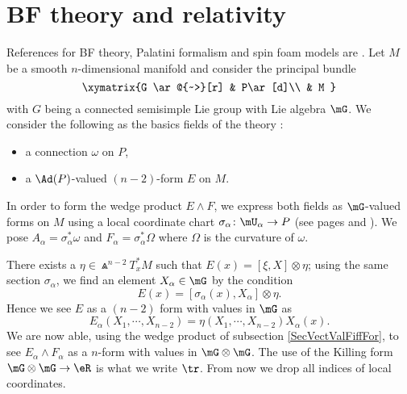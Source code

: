 \section{BF theory and relativity}

References for BF theory, Palatini formalism and spin foam models are \cite{bkindep,degesols,itospinfoam}. Let $M$ be a smooth $n$-dimensional manifold and consider the principal bundle
\begin{equation}
\xymatrix{%
 G   \ar@{~>}[r]		&	P\ar[d]\\
   				&	M
 }
\end{equation}
with $G$ being a connected semisimple Lie group with Lie algebra $\mG$. We consider the following as the basics fields of the theory :
\begin{itemize}
\item a connection $\omega$ on $P$,
\item a $\Ad(P)$-valued $(n-2)$-form $E$ on $M$.
\end{itemize}
In order to form the wedge product $E\wedge F$, we express both fields as $\mG$-valued forms on $M$ using a local coordinate chart $\sigma_{\alpha}\colon \mU_{\alpha}\to P$ (see pages \pageref{PgLocSecCurv} and \pageref{PgLocSecConn} ). We pose $A_{\alpha}=\sigma_{\alpha}^*\omega$ and $F_{\alpha}=\sigma_{\alpha}^*\Omega$ where $\Omega$ is the curvature of $\omega$.

There exists a $\eta\in\Wedge^{n-2}T_x^*M$ such that $E(x)=[\xi,X]\otimes\eta$; using the same section $\sigma_{\alpha}$, we find an element $X_{\alpha}\in\mG$ by the condition
\[ 
  E(x)=[\sigma_{\alpha}(x),X_{\alpha}]\otimes\eta.
\]
Hence we see $E$ as a $(n-2)$ form with values in $\mG$ as
\begin{equation}
E_{\alpha}(X_1,\cdots,X_{n-2})=\eta(X_1,\cdots,X_{n-2})X_{\alpha}(x).
\end{equation}
We are now able, using the wedge product of subsection \ref{SecVectValFiffFor}, to see $E_{\alpha}\wedge F_{\alpha}$ as a $n$-form with values in $\mG\otimes\mG$. The use of the Killing form $\mG\otimes\mG\to\eR$ is what we write $\tr$. From now we drop all indices of local coordinates.

